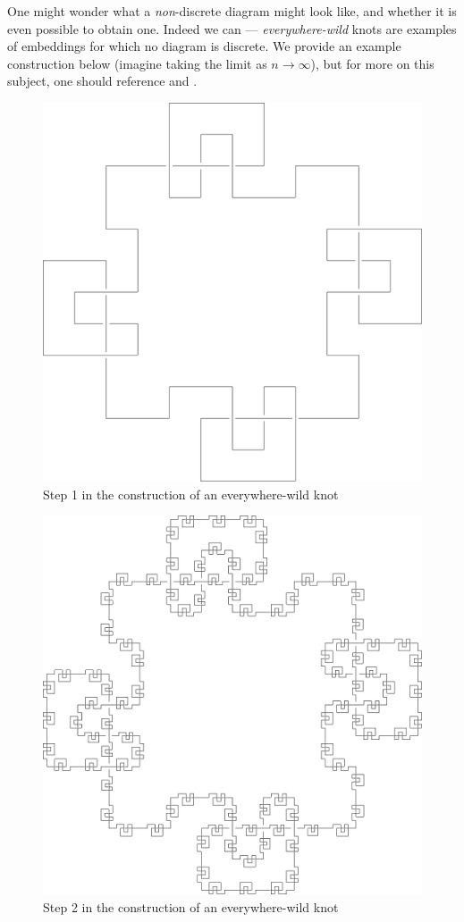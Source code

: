 One might wonder what a \emph{non}-discrete diagram might look like,
and whether it is even possible to obtain one. Indeed we can ---
\emph{everywhere-wild} knots are examples of embeddings for which no
diagram is discrete. We provide an example construction below (imagine
taking the limit as $n \to \infty$), but for more on this subject, one
should reference \cite{Shilepsky} and \cite{Bothe1981}.
\begin{figure}[H]
  \centering
  \includegraphics[scale=.3]{figures/infinite-gauss-sequence/test/test-0.pdf}
  \caption{Step 1 in the construction of an everywhere-wild knot}
\end{figure}
\begin{figure}[H]
  \centering
  \includegraphics[scale=.3]{figures/infinite-gauss-sequence/test/test-1.pdf}
  \caption{Step 2 in the construction of an everywhere-wild knot}
\end{figure}
